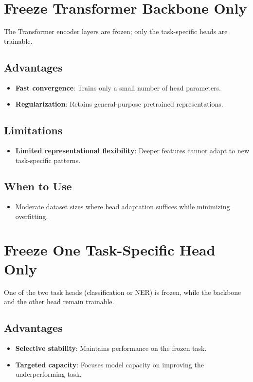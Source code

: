 \documentclass{article}
\begin{document}
\section{Freeze Transformer Backbone Only}
The Transformer encoder layers are frozen; only the task-specific heads are trainable.

\subsection*{Advantages}
\begin{itemize}
  \item \textbf{Fast convergence}: Trains only a small number of head parameters.
  \item \textbf{Regularization}: Retains general-purpose pretrained representations.
\end{itemize}

\subsection*{Limitations}
\begin{itemize}
  \item \textbf{Limited representational flexibility}: Deeper features cannot adapt to new task-specific patterns.
\end{itemize}

\subsection*{When to Use}
\begin{itemize}
  \item Moderate dataset sizes where head adaptation suffices while minimizing overfitting.
\end{itemize}

\section{Freeze One Task-Specific Head Only}
One of the two task heads (classification or NER) is frozen, while the backbone and the other head remain trainable.

\subsection*{Advantages}
\begin{itemize}
  \item \textbf{Selective stability}: Maintains performance on the frozen task.
  \item \textbf{Targeted capacity}: Focuses model capacity on improving the underperforming task.
\end{itemize}
\end{document}
